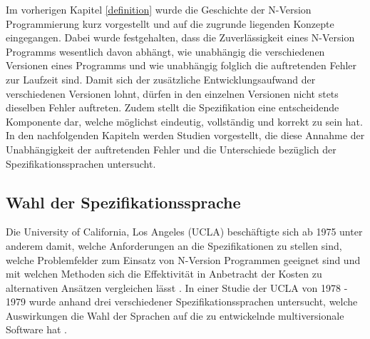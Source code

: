 %
Im vorherigen Kapitel \ref{definition} wurde die Geschichte der N-Version Programmierung kurz vorgestellt und auf die zugrunde liegenden Konzepte eingegangen.
Dabei wurde festgehalten, dass die Zuverlässigkeit eines N-Version Programms wesentlich davon abhängt, wie unabhängig die verschiedenen Versionen eines Programms und wie unabhängig folglich die auftretenden Fehler zur Laufzeit sind. Damit sich der zusätzliche Entwicklungsaufwand der verschiedenen Versionen lohnt, dürfen in den einzelnen Versionen nicht stets dieselben Fehler auftreten.
Zudem stellt die Spezifikation eine entscheidende Komponente dar, welche möglichst eindeutig, vollständig und korrekt zu sein hat.
In den nachfolgenden Kapiteln werden Studien vorgestellt, die diese Annahme der Unabhängigkeit der auftretenden Fehler und die Unterschiede bezüglich der Spezifikationssprachen untersucht.
%
\subsection{Wahl der Spezifikationssprache}\label{uclastudies}
Die University of California, Los Angeles (UCLA) beschäftigte sich ab 1975 unter anderem damit, welche Anforderungen an die Spezifikationen zu stellen sind, welche Problemfelder zum Einsatz von N-Version Programmen geeignet sind und mit welchen Methoden sich die Effektivität in Anbetracht der Kosten zu alternativen Ansätzen vergleichen lässt \cite{Avizienis:1985:NAF:1314034.1314064}.
In einer Studie der UCLA von 1978 - 1979 wurde anhand drei verschiedener Spezifikationssprachen untersucht, welche Auswirkungen die Wahl der Sprachen auf die zu entwickelnde multiversionale Software hat \cite{methodology}.
